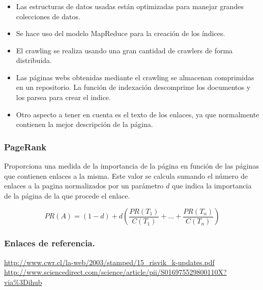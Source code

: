 \documentclass[9pt]{beamer} %
\begin{document}
\begin{frame}
	\frametitle{}
\begin{itemize}
	\item Las estructuras de datos usadas están optimizadas para manejar grandes colecciones de datos.
	\item Se hace uso del modelo MapReduce para la creación de los índices.
	\item El crawling se realiza usando una gran cantidad de crawlers de forma distribuida.
	\item Las páginas webs obtenidas mediante el crawling se almacenan comprimidas en un repositorio. La función de indexación descomprime los documentos y los parsea para crear el indice.
	\item Otro aspecto a tener en cuenta es el texto de los enlaces, ya que normalmente contienen la mejor descripción de la página.
\end{itemize}		
\end{frame}

\begin{frame}
	\frametitle{PageRank}
Proporciona una medida de la importancia de la página en función de las páginas que contienen enlaces a la misma. Este valor se calcula sumando el número de enlaces a la pagina normalizados por un parámetro $d$ que indica la importancia de la página de la que procede el enlace.

\[
PR(A)=(1-d)+d(\frac{PR(T_1)}{C(T_1)}+...+\frac{PR(T_n)}{C(T_n)})
\]
\end{frame}
\begin{frame}
	\frametitle{Enlaces de referencia.}
	\begin{thebibliography}{9}
		
		\url{http://www.cwr.cl/la-web/2003/stamped/15_risvik_k-updates.pdf}
		\url{http://www.sciencedirect.com/science/article/pii/S016975529800110X?via\%3Dihub}
		
	\end{thebibliography}
\end{frame}
\end{document}

